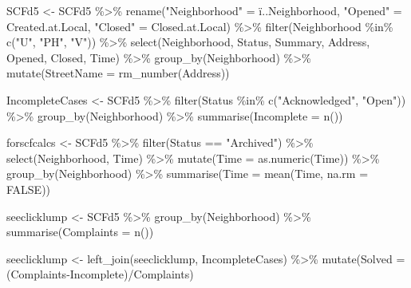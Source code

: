 \documentclass[
]{article}
\newenvironment{Shaded}{\begin{snugshade}}{\end{snugshade}}
\newcommand{\AttributeTok}[1]{\textcolor[rgb]{0.77,0.63,0.00}{#1}}
\newcommand{\ConstantTok}[1]{\textcolor[rgb]{0.00,0.00,0.00}{#1}}
\newcommand{\FunctionTok}[1]{\textcolor[rgb]{0.00,0.00,0.00}{#1}}
\newcommand{\NormalTok}[1]{#1}
\newcommand{\OtherTok}[1]{\textcolor[rgb]{0.56,0.35,0.01}{#1}}
\newcommand{\SpecialCharTok}[1]{\textcolor[rgb]{0.00,0.00,0.00}{#1}}
\newcommand{\StringTok}[1]{\textcolor[rgb]{0.31,0.60,0.02}{#1}}
\begin{document}
\begin{Shaded}
\begin{Highlighting}[]
\NormalTok{SCFd5 }\OtherTok{\textless{}{-}}\NormalTok{ SCFd5 }\SpecialCharTok{\%\textgreater{}\%} 
\FunctionTok{rename}\NormalTok{(}\StringTok{"Neighborhood"} \OtherTok{=}\NormalTok{ ï..Neighborhood, }\StringTok{"Opened"} \OtherTok{=}\NormalTok{ Created.at.Local, }\StringTok{"Closed"} \OtherTok{=}\NormalTok{ Closed.at.Local) }\SpecialCharTok{\%\textgreater{}\%}
  \FunctionTok{filter}\NormalTok{(Neighborhood }\SpecialCharTok{\%in\%} \FunctionTok{c}\NormalTok{(}\StringTok{"U"}\NormalTok{, }\StringTok{"PH"}\NormalTok{, }\StringTok{"V"}\NormalTok{)) }\SpecialCharTok{\%\textgreater{}\%}
  \FunctionTok{select}\NormalTok{(Neighborhood, Status, Summary, Address, Opened, Closed, Time) }\SpecialCharTok{\%\textgreater{}\%}
  \FunctionTok{group\_by}\NormalTok{(Neighborhood) }\SpecialCharTok{\%\textgreater{}\%}
  \FunctionTok{mutate}\NormalTok{(}\AttributeTok{StreetName =} \FunctionTok{rm\_number}\NormalTok{(Address)) }

\NormalTok{IncompleteCases }\OtherTok{\textless{}{-}}\NormalTok{ SCFd5 }\SpecialCharTok{\%\textgreater{}\%}
  \FunctionTok{filter}\NormalTok{(Status }\SpecialCharTok{\%in\%} \FunctionTok{c}\NormalTok{(}\StringTok{"Acknowledged"}\NormalTok{, }\StringTok{"Open"}\NormalTok{)) }\SpecialCharTok{\%\textgreater{}\%}
  \FunctionTok{group\_by}\NormalTok{(Neighborhood) }\SpecialCharTok{\%\textgreater{}\%}
  \FunctionTok{summarise}\NormalTok{(}\AttributeTok{Incomplete =} \FunctionTok{n}\NormalTok{())}
  

\NormalTok{forscfcalcs }\OtherTok{\textless{}{-}}\NormalTok{ SCFd5 }\SpecialCharTok{\%\textgreater{}\%}
  \FunctionTok{filter}\NormalTok{(Status }\SpecialCharTok{==} \StringTok{"Archived"}\NormalTok{) }\SpecialCharTok{\%\textgreater{}\%}
  \FunctionTok{select}\NormalTok{(Neighborhood, Time) }\SpecialCharTok{\%\textgreater{}\%}
  \FunctionTok{mutate}\NormalTok{(}\AttributeTok{Time =} \FunctionTok{as.numeric}\NormalTok{(Time)) }\SpecialCharTok{\%\textgreater{}\%}
  \FunctionTok{group\_by}\NormalTok{(Neighborhood) }\SpecialCharTok{\%\textgreater{}\%}
  \FunctionTok{summarise}\NormalTok{(}\AttributeTok{Time =} \FunctionTok{mean}\NormalTok{(Time, }\AttributeTok{na.rm =} \ConstantTok{FALSE}\NormalTok{))}

\NormalTok{seeclicklump }\OtherTok{\textless{}{-}}\NormalTok{ SCFd5 }\SpecialCharTok{\%\textgreater{}\%}
  \FunctionTok{group\_by}\NormalTok{(Neighborhood) }\SpecialCharTok{\%\textgreater{}\%}
  \FunctionTok{summarise}\NormalTok{(}\AttributeTok{Complaints =} \FunctionTok{n}\NormalTok{()) }

\NormalTok{seeclicklump }\OtherTok{\textless{}{-}}  \FunctionTok{left\_join}\NormalTok{(seeclicklump, IncompleteCases)  }\SpecialCharTok{\%\textgreater{}\%}
  \FunctionTok{mutate}\NormalTok{(}\AttributeTok{Solved =}\NormalTok{ (Complaints}\SpecialCharTok{{-}}\NormalTok{Incomplete)}\SpecialCharTok{/}\NormalTok{Complaints)  }
\end{Highlighting}
\end{Shaded}
\end{document}
